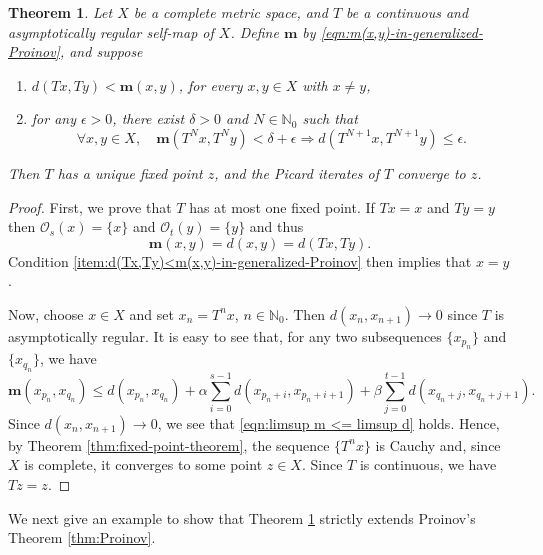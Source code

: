 \documentclass[a4paper,10pt,twoside,reqno]{amsart}
\newtheorem{thm}{Theorem}[section]
\theoremstyle{definition}
\theoremstyle{remark}
\newcommand{\al}{\alpha}
\newcommand{\be}{\beta}
\newcommand{\de}{\delta}
\newcommand{\e}{\epsilon}
\newcommand{\N}{\mathbb{N}}
\newcommand{\m}{\mathbf{m}}
\newcommand{\cO}{\mathcal{O}}
\numberwithin{equation}{section}
\begin{document}
\begin{thm}
\label{thm:Generalized-Proinov}
  Let $X$ be a complete metric space, and $T$ be a continuous and
  asymptotically regular self-map of $X$. Define $\m$ by
  \eqref{eqn:m(x,y)-in-generalized-Proinov}, and suppose
  \begin{enumerate}[\upshape(i)]
    \item \label{item:d(Tx,Ty)<m(x,y)-in-generalized-Proinov}
    $d(Tx,Ty)<\m(x,y)$, for every $x,y\in X$ with $x\neq y$,

    \item \label{item:m-contractive-in-generalized-Proinov}
    for any $\e>0$, there exist $\de>0$ and $N\in\N_0$ such that
    \begin{equation}\label{eqn:m-contractive-in-generalized-Proinov}
      \forall x,y\in X, \quad
       \m(T^Nx, T^Ny) < \de+\e \Longrightarrow d(T^{N+1}x,T^{N+1}y)\leq \e.
    \end{equation}
  \end{enumerate}
  Then $T$ has a unique fixed point $z$, and the Picard iterates of $T$
  converge to $z$.
\end{thm}

\begin{proof}
  First, we prove that $T$ has at most one fixed point. If $Tx=x$ and
  $Ty=y$ then $\cO_s(x)=\{x\}$ and $\cO_t(y)=\{y\}$ and thus
  \[
    \m(x,y)=d(x,y)=d(Tx,Ty).
  \]
  Condition \eqref{item:d(Tx,Ty)<m(x,y)-in-generalized-Proinov}
  then implies that $x=y$.

  Now, choose $x\in X$ and set $x_n=T^nx$, $n\in\N_0$.
  Then $d(x_n,x_{n+1})\to0$ since $T$ is asymptotically regular. It is easy to see that,
  for any two subsequences $\{x_{p_n}\}$ and $\{x_{q_n}\}$, we have
  \[
    \m(x_{p_n},x_{q_n})
     \leq d(x_{p_n},x_{q_n})
      + \al \sum_{i=0}^{s-1} d(x_{p_n+i},x_{p_n+i+1})
      + \be \sum_{j=0}^{t-1} d(x_{q_n+j},x_{q_n+j+1}).
  \]
  Since $d(x_n,x_{n+1})\to0$, we see that \eqref{eqn:limsup m <= limsup d}
  holds. Hence, by Theorem \ref{thm:fixed-point-theorem}, the sequence
  $\{T^nx\}$ is Cauchy and, since $X$ is complete,
  it converges to some point $z\in X$.
  Since $T$ is continuous, we have $Tz=z$.
\end{proof}

We next give an example to show that Theorem \ref{thm:Generalized-Proinov}
strictly extends Proinov's Theorem \ref{thm:Proinov}.
\end{document}
